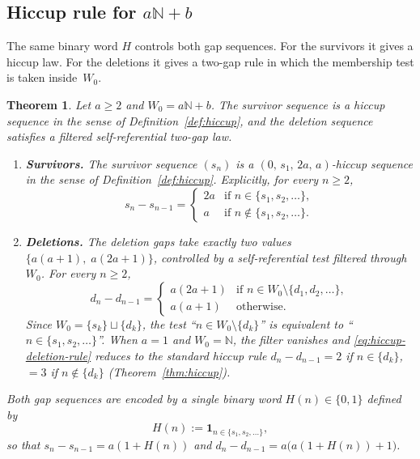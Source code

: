 \documentclass[11pt]{article}
\numberwithin{equation}{section}
\theoremstyle{plain}
\newtheorem{theorem}{Theorem}[section]
\theoremstyle{definition}
\theoremstyle{remark}
\newcommand{\N}{\mathbb{N}}
\begin{document}
\subsection{Hiccup rule for \texorpdfstring{$a\N+b$}{aN+b}}\label{sec:hiccup-ab}

The same binary word $H$ controls both gap sequences.
For the survivors it gives a hiccup law.
For the deletions it gives a two-gap rule in which the membership test
is taken inside~$W_0$.

\begin{theorem}\label{thm:hiccup-ab}
Let $a\ge2$ and $W_0=a\N+b$.
The survivor sequence is a hiccup sequence in the sense of
Definition~\ref{def:hiccup}, and the deletion sequence satisfies a
filtered self-referential two-gap law.
\begin{enumerate}
\item[\textup{(i)}] \textbf{Survivors.}
The survivor sequence $(s_n)$ is a $(0,\,s_1,\,2a,\,a)$-hiccup
sequence in the sense of Definition~\textup{\ref{def:hiccup}}.
Explicitly, for every $n\ge2$,
\begin{equation}\label{eq:hiccup-survivor-rule}
  s_n - s_{n-1} =
  \begin{cases}
    2a & \text{if } n\in\{s_1,s_2,\ldots\},\\
    a  & \text{if } n\notin\{s_1,s_2,\ldots\}.
  \end{cases}
\end{equation}

\item[\textup{(ii)}] \textbf{Deletions.}
The deletion gaps take exactly two values $\{a(a\!+\!1),\;a(2a\!+\!1)\}$,
controlled by a self-referential test filtered through~$W_0$.
For every $n\ge2$,
\begin{equation}\label{eq:hiccup-deletion-rule}
  d_n - d_{n-1} =
  \begin{cases}
    a(2a+1) & \text{if } n\in W_0\setminus\{d_1,d_2,\ldots\},\\
    a(a+1)  & \text{otherwise.}
  \end{cases}
\end{equation}
Since $W_0 = \{s_k\}\sqcup\{d_k\}$, the test
``$n\in W_0\setminus\{d_k\}$'' is equivalent to
``$n\in\{s_1,s_2,\ldots\}$''.  When $a=1$ and $W_0=\N$, the
filter vanishes and \eqref{eq:hiccup-deletion-rule} reduces to the
standard hiccup rule $d_n-d_{n-1}=2$ if $n\in \{d_k\}$, $=3$ if
$n\notin \{d_k\}$ \textup{(}Theorem~\textup{\ref{thm:hiccup})}.
\end{enumerate}
Both gap sequences are encoded by a single binary word $H(n)\in\{0,1\}$
defined by
\[
  H(n) := \mathbf{1}_{n\in\{s_1,s_2,\ldots\}},
\]
so that $s_n-s_{n-1}=a(1+H(n))$ and
$d_n-d_{n-1}=a\bigl(a(1+H(n))+1\bigr)$.
\end{theorem}
\end{document}
